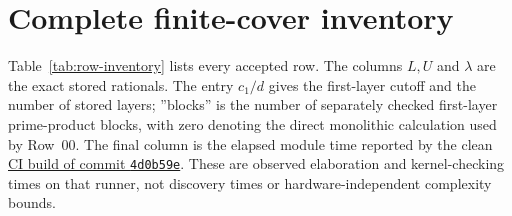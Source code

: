 \documentclass[11pt]{amsart}
\theoremstyle{definition}
\theoremstyle{remark}
\numberwithin{equation}{section}
\newcommand{\repositoryurl}{https://github.com/kimihiro64/Robin1984}
\newcommand{\runlink}[2]{%
  \href{\repositoryurl/actions/runs/#1}{#2}}
\begin{document}
\section{Complete finite-cover inventory}\label{app:cover-inventory}

Table~\ref{tab:row-inventory} lists every accepted row.  The columns $L,U$
and $\lambda$ are the exact stored rationals.  The entry $c_1/d$ gives the
first-layer cutoff and the number of stored layers; ''blocks'' is the number
of separately checked first-layer prime-product blocks, with zero denoting the
direct monolithic calculation used by Row~00.  The final column is the elapsed
module time reported by the clean
\runlink{33661242178}{CI build of commit \texttt{4d0b59e}}.  These are
observed elaboration and kernel-checking times on that runner, not discovery
times or hardware-independent complexity bounds.
\end{document}
